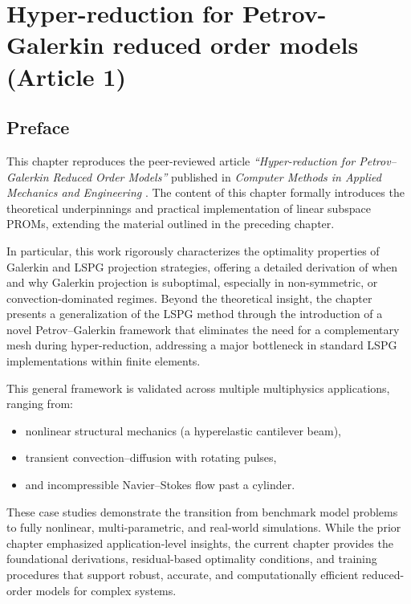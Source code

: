 \chapter{Hyper-reduction for Petrov-Galerkin reduced order models (Article 1)}
\label{chap:article1}

\section*{Preface}

This chapter reproduces the peer-reviewed article \textit{``Hyper-reduction for Petrov–Galerkin Reduced Order Models''} published in \textit{Computer Methods in Applied Mechanics and Engineering} \cite{Ares2023}. The content of this chapter formally introduces the theoretical underpinnings and practical implementation of linear subspace PROMs, extending the material outlined in the preceding chapter.

In particular, this work rigorously characterizes the optimality properties of Galerkin and LSPG projection strategies, offering a detailed derivation of when and why Galerkin projection is suboptimal, especially in non-symmetric, or convection-dominated regimes. Beyond the theoretical insight, the chapter presents a generalization of the LSPG method through the introduction of a novel Petrov–Galerkin framework that eliminates the need for a complementary mesh during hyper-reduction, addressing a major bottleneck in standard LSPG implementations within finite elements.

This general framework is validated across multiple multiphysics applications, ranging from:
\begin{itemize}
    \item nonlinear structural mechanics (a hyperelastic cantilever beam),
    \item transient convection–diffusion with rotating pulses,
    \item and incompressible Navier–Stokes flow past a cylinder.
\end{itemize}

These case studies demonstrate the transition from benchmark model problems to fully nonlinear, multi-parametric, and real-world simulations. While the prior chapter emphasized application-level insights, the current chapter provides the foundational derivations, residual-based optimality conditions, and training procedures that support robust, accurate, and computationally efficient reduced-order models for complex systems.






